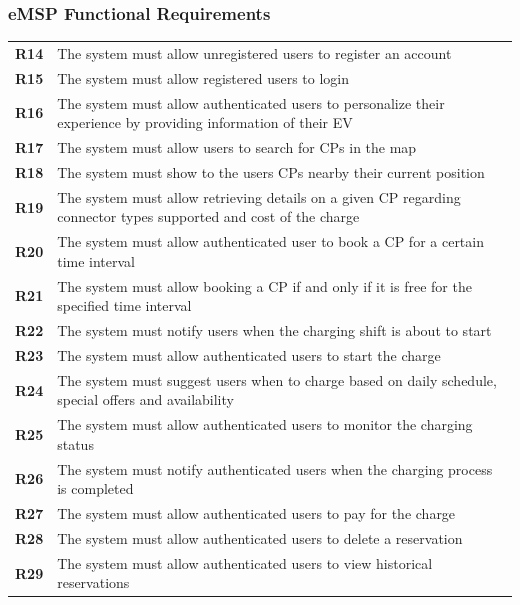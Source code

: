 \subsubsection{eMSP Functional Requirements}
\begin{table}[H]
    \begin{tabularx}{\textwidth}{cX}
        \toprule
        \textbf{R14} & The system must allow unregistered users to register an account                                                   \\
        \textbf{R15} & The system must allow registered users to login                                                                   \\
        \textbf{R16} & The system must allow authenticated users to personalize their experience by providing information of their EV    \\
        \textbf{R17} & The system must allow users to search for CPs in the map                                                          \\
        \textbf{R18} & The system must show to the users CPs nearby their current position                                               \\
        \textbf{R19} & The system must allow retrieving details on a given CP regarding connector types supported and cost of the charge \\
        \textbf{R20} & The system must allow authenticated user to book a CP for a certain time interval                                 \\
        \textbf{R21} & The system must allow booking a CP if and only if it is free for the specified time interval                      \\
        \textbf{R22} & The system must notify users when the charging shift is about to start                                            \\
        \textbf{R23} & The system must allow authenticated users to start the charge                                                     \\
        \textbf{R24} & The system must suggest users when to charge based on daily schedule, special offers and availability             \\
        \textbf{R25} & The system must allow authenticated users to monitor the charging status                                          \\
        \textbf{R26} & The system must notify authenticated users when the charging process is completed                                 \\
        \textbf{R27} & The system must allow authenticated users to pay for the charge                                                   \\
        \textbf{R28} & The system must allow authenticated users to delete a reservation                                                 \\
        \textbf{R29} & The system must allow authenticated users to view historical reservations                                         \\ \bottomrule
    \end{tabularx}
\end{table}

